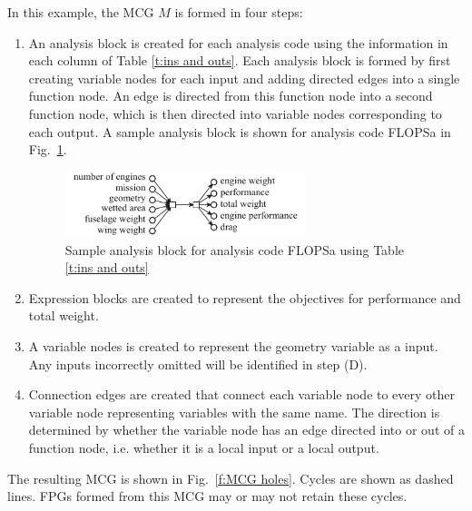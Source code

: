 	In this example, the MCG $M$ is formed in four steps:
	\begin{enumerate}
	\item An analysis block is created for each analysis code using the information in each column of Table \ref{t:ins and outs}. 
	Each analysis block is formed by first creating variable nodes for each input and adding directed edges into a single function node. An edge is directed from this function node into a second function node, which is then directed into variable nodes corresponding to each output. 
	A sample analysis block is shown for analysis code FLOPSa in Fig.~\ref{f:FLOPSb analysis block}.
	\begin{figure}[htb!]
	  \begin{center}
		\includegraphics[width=2.75in]{images/FLOPSa_analysis_block}
	  \end{center}
	  \caption{Sample analysis block for analysis code FLOPSa using Table \ref{t:ins and outs}}
	\label{f:FLOPSb analysis block}
	\end{figure}

	\item Expression blocks are created to represent the objectives for performance and total weight.

	\item A variable nodes is created to represent the geometry variable as a input. Any inputs incorrectly omitted will be identified in step (D).

	\item Connection edges are created that connect each variable node to every other variable node representing variables with the same name. 
	The direction is determined by whether the variable node has an edge directed into or out of a function node, i.e. whether it is a local input or a local output.
	\end{enumerate}
	The resulting MCG is shown in Fig.~\ref{f:MCG holes}. 
	Cycles are shown as dashed lines. FPGs formed from this MCG may or may not retain these cycles.
